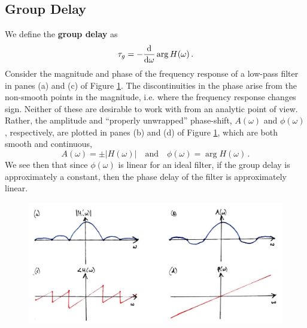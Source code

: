 \subsection{Group Delay}
%
We define the \textbf{group delay} as
%
\begin{displaymath}
  \tau_g = -\frac{\mathrm{d}}{\mathrm{d\omega}} \arg H(\omega) \,.
\end{displaymath}
%
Consider the magnitude and phase of the frequency response of a
low-pass filter in panes (a) and (c) of Figure
\ref{fig::lecture_16_amplitude_response}. The discontinuities in the phase 
arise from the non-smooth points in the magnitude, i.e. where the frequency
response changes sign. Neither of these are desirable to work with from
an analytic point of view. Rather, the amplitude and ``properly unwrapped''
phase-shift, $A(\omega)$ and $\phi(\omega)$, respectively, are plotted in
panes (b) and (d) of Figure \ref{fig::lecture_16_amplitude_response},
which are both smooth and continuous,
%
\begin{displaymath}
  A(\omega) = \pm |H(\omega)| \quad\mathrm{and}\quad
  \phi(\omega) = \arg H(\omega) \,.
\end{displaymath}
%
We see then that since $\phi(\omega)$ is linear for an ideal filter, if the
group delay is approximately a constant, then the phase delay of the filter
is approximately linear.
%
\begin{figure}[!htb]
  \includegraphics[width=\textwidth]{images/lecture_16_amplitude_response.JPG}
  \caption{
  }
  \label{fig::lecture_16_amplitude_response}
\end{figure}

